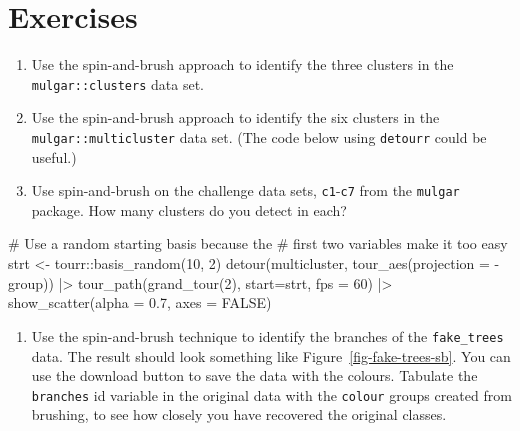 \documentclass[
  letterpaper,
]{krantz}
\newenvironment{Shaded}{\begin{snugshade}}{\end{snugshade}}
\newcommand{\AttributeTok}[1]{\textcolor[rgb]{0.40,0.45,0.13}{#1}}
\newcommand{\CommentTok}[1]{\textcolor[rgb]{0.37,0.37,0.37}{#1}}
\newcommand{\ConstantTok}[1]{\textcolor[rgb]{0.56,0.35,0.01}{#1}}
\newcommand{\DecValTok}[1]{\textcolor[rgb]{0.68,0.00,0.00}{#1}}
\newcommand{\FloatTok}[1]{\textcolor[rgb]{0.68,0.00,0.00}{#1}}
\newcommand{\FunctionTok}[1]{\textcolor[rgb]{0.28,0.35,0.67}{#1}}
\newcommand{\NormalTok}[1]{\textcolor[rgb]{0.00,0.23,0.31}{#1}}
\newcommand{\OtherTok}[1]{\textcolor[rgb]{0.00,0.23,0.31}{#1}}
\newcommand{\SpecialCharTok}[1]{\textcolor[rgb]{0.37,0.37,0.37}{#1}}
\providecommand{\tightlist}{%
  \setlength{\itemsep}{0pt}\setlength{\parskip}{0pt}}
\begin{document}
\section*{Exercises}\label{exercises-6}


  

\begin{enumerate}
\def\labelenumi{\arabic{enumi}.}
\tightlist
\item
  Use the spin-and-brush approach to identify the three clusters in the
  \texttt{mulgar::clusters} data set.
\item
  Use the spin-and-brush approach to identify the six clusters in the
  \texttt{mulgar::multicluster} data set. (The code below using
  \texttt{detourr} could be useful.)
\item
  Use spin-and-brush on the challenge data sets, \texttt{c1}-\texttt{c7}
  from the \texttt{mulgar} package. How many clusters do you detect in
  each?
\end{enumerate}

\begin{Shaded}
\begin{Highlighting}[]
\CommentTok{\# Use a random starting basis because the }
\CommentTok{\# first two variables make it too easy}
\NormalTok{strt }\OtherTok{\textless{}{-}}\NormalTok{ tourr}\SpecialCharTok{::}\FunctionTok{basis\_random}\NormalTok{(}\DecValTok{10}\NormalTok{, }\DecValTok{2}\NormalTok{)}
\FunctionTok{detour}\NormalTok{(multicluster, }
       \FunctionTok{tour\_aes}\NormalTok{(}\AttributeTok{projection =} \SpecialCharTok{{-}}\NormalTok{group)) }\SpecialCharTok{|\textgreater{}}
       \FunctionTok{tour\_path}\NormalTok{(}\FunctionTok{grand\_tour}\NormalTok{(}\DecValTok{2}\NormalTok{), }
                 \AttributeTok{start=}\NormalTok{strt, }\AttributeTok{fps =} \DecValTok{60}\NormalTok{) }\SpecialCharTok{|\textgreater{}}
       \FunctionTok{show\_scatter}\NormalTok{(}\AttributeTok{alpha =} \FloatTok{0.7}\NormalTok{, }
                    \AttributeTok{axes =} \ConstantTok{FALSE}\NormalTok{)}
\end{Highlighting}
\end{Shaded}

\begin{enumerate}
\def\labelenumi{\arabic{enumi}.}
\setcounter{enumi}{3}
\tightlist
\item
  Use the spin-and-brush technique to identify the branches of the
  \texttt{fake\_trees} data. The result should look something like
  Figure~\ref{fig-fake-trees-sb}. You can use the download button to
  save the data with the colours. Tabulate the \texttt{branches} id
  variable in the original data with the \texttt{colour} groups created
  from brushing, to see how closely you have recovered the original
  classes.
\end{enumerate}
\end{document}
